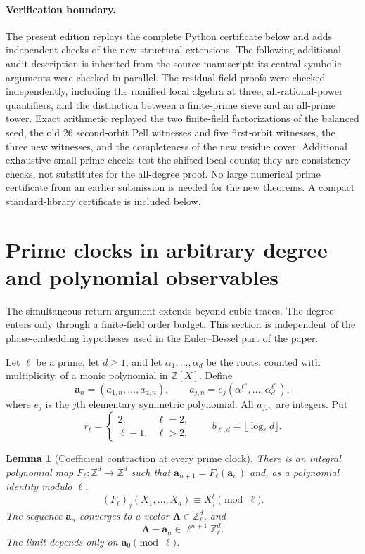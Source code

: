 \documentclass[11pt,a4paper]{article}
\newtheorem{lemma}[theorem]{Lemma}
\theoremstyle{definition}\newtheorem{definition}[theorem]{Definition}
\theoremstyle{remark}\newtheorem{remark}[theorem]{Remark}
\begin{document}
\paragraph{Verification boundary.}
The present edition replays the complete Python certificate below and
adds independent checks of the new structural extensions. The following
additional audit description is inherited from the source manuscript:
its central symbolic arguments were checked in parallel. The residual-field proofs were checked independently,
including the ramified local algebra at three, all-rational-power
quantifiers, and the distinction between a finite-prime sieve and an
all-prime tower. Exact arithmetic replayed the two finite-field
factorizations of the balanced seed, the old 26 second-orbit Pell
witnesses and five first-orbit witnesses, the three new witnesses,
and the completeness of the new residue cover. Additional exhaustive
small-prime checks test the shifted local counts; they are consistency
checks, not substitutes for the all-degree proof. No large numerical
prime certificate from an earlier submission is needed for the new
theorems. A compact standard-library certificate is included below.

\section{Prime clocks in arbitrary degree and polynomial observables}
\label{newclock:sec}

The simultaneous-return argument extends beyond cubic traces.  The
degree enters only through a finite-field order budget.  This section
is independent of the phase-embedding hypotheses used in the
Euler--Bessel part of the paper.

Let $\ell$ be a prime, let $d\ge1$, and let
$\alpha_1,\ldots,\alpha_d$ be the roots, counted with multiplicity,
of a monic polynomial in $\mathbb Z[X]$.  Define
\[
 \boldsymbol a_n=(a_{1,n},\ldots,a_{d,n}),\qquad
 a_{j,n}=e_j(\alpha_1^{\ell^n},\ldots,\alpha_d^{\ell^n}),
\]
where $e_j$ is the $j$th elementary symmetric polynomial.  All
$a_{j,n}$ are integers.  Put
\[
 r_\ell=\begin{cases}2,&\ell=2,\\ \ell-1,&\ell>2,\end{cases}
 \qquad b_{\ell,d}=\lfloor\log_\ell d\rfloor.
\]

\begin{lemma}[Coefficient contraction at every prime clock]
\label{newclock:contraction}
There is an integral polynomial map $F_\ell:\mathbb Z^d\to
\mathbb Z^d$ such that $\boldsymbol a_{n+1}=F_\ell(\boldsymbol
a_n)$ and, as a polynomial identity modulo $\ell$,
\[
 (F_\ell)_j(X_1,\ldots,X_d)\equiv X_j^\ell\pmod\ell.
\]
The sequence $\boldsymbol a_n$ converges to a vector
$\boldsymbol\Lambda\in\mathbb Z_\ell^d$, and
\[
 \boldsymbol\Lambda-\boldsymbol a_n
     \in\ell^{n+1}\mathbb Z_\ell^d.
\]
The limit depends only on $\boldsymbol a_0\pmod\ell$.
\end{lemma}
\end{document}
